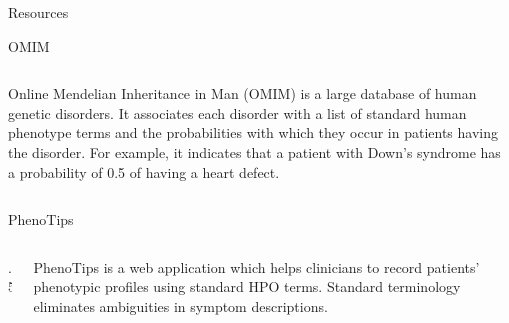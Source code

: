 \documentclass[final]{beamer} %
\begin{document}
\begin{frame}{}
\begin{columns}[T]
\begin{column}{0.3\linewidth}
\begin{block}{\Huge Resources}
\begin{block}{\Large OMIM}
\begin{columns}[T]
        \begin{column}{.5\textwidth}
          \Large Online Mendelian Inheritance in Man (OMIM) is a large
          database of human genetic disorders. It associates each
          disorder with a list of standard human phenotype terms and
          the probabilities with which they occur in patients having
          the disorder. For example, it indicates that a patient with
          Down's syndrome has a probability of 0.5 of having a heart
          defect.
        \end{column}
      \end{columns}
    \end{block}

  

    \begin{block}{\Large PhenoTips}
      \begin{columns}[T]
        \begin{column} {.5\textwidth}
          \centering
        \end{column}
        
        \begin{column}{.5\textwidth}
          \Large PhenoTips is a web application which helps clinicians
          to record patients' phenotypic profiles using standard HPO
          terms. Standard terminology eliminates ambiguities in
          symptom descriptions.
        \end{column}
      \end{columns}
    \end{block}

  \end{block}


\end{column}
\end{columns}
\end{frame}
\end{document}
